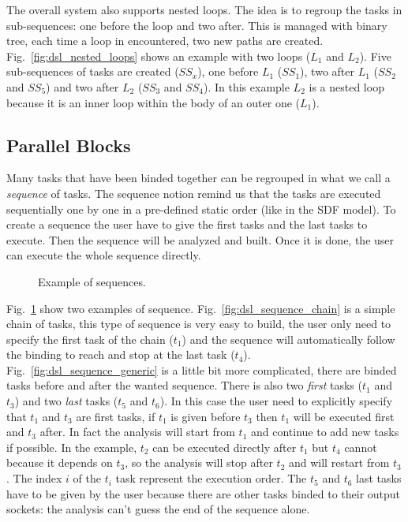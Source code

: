 The overall system also supports nested loops. The idea is to regroup the tasks
in sub-sequences: one before the loop and two after. This is managed with binary
tree, each time a loop in encountered, two new paths are created.
Fig.~\ref{fig:dsl_nested_loops} shows an example with two loops ($L_1$ and
$L_2$). Five sub-sequences of tasks are created ($SS_x$), one before $L_1$
($SS_1$), two after $L_1$ ($SS_2$ and $SS_5$) and two after $L_2$ ($SS_3$ and
$SS_4$). In this example $L_2$ is a nested loop because it is an inner loop
within the body of an outer one ($L_1$).

\subsection{Parallel Blocks}

Many tasks that have been binded together can be regrouped in what we call a
\emph{sequence} of tasks. The sequence notion remind us that the tasks are
executed sequentially one by one in a pre-defined static order (like in the SDF
model). To create a sequence the user have to give the first tasks and the
last tasks to execute. Then the sequence will be analyzed and built. Once it is
done, the user can execute the whole sequence directly.

\begin{figure}[htp]
  \centering
  \quad
  \caption{Example of sequences.}
  \label{fig:dsl_sequence}
\end{figure}

Fig.~\ref{fig:dsl_sequence} show two examples of sequence.
Fig.~\ref{fig:dsl_sequence_chain} is a simple chain of tasks, this type of
sequence is very easy to build, the user only need to specify the first task of
the chain ($t_1$) and the sequence will automatically follow the binding to
reach and stop at the last task ($t_4$). Fig.~\ref{fig:dsl_sequence_generic} is
a little bit more complicated, there are binded tasks before and after the
wanted sequence. There is also two \emph{first} tasks ($t_1$ and $t_3$) and
two \emph{last} tasks ($t_5$ and $t_6$). In this case the user need to
explicitly specify that $t_1$ and $t_3$ are first tasks, if $t_1$ is given
before $t_3$ then $t_1$ will be executed first and $t_3$ after. In fact the
analysis will start from $t_1$ and continue to add new tasks if possible. In the
example, $t_2$ can be executed directly after $t_1$ but $t_4$ cannot because it
depends on $t_3$, so the analysis will stop after $t_2$ and will restart from
$t_3$. The index $i$ of the $t_i$ task represent the execution order. The $t_5$
and $t_6$ last tasks have to be given by the user because there are other tasks
binded to their output sockets: the analysis can't guess the end of the sequence
alone.

